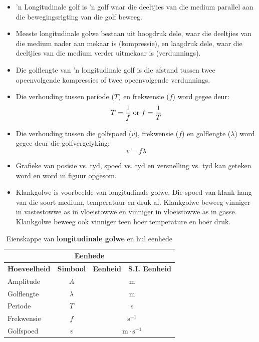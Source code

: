 \nopagebreak
      \label{m38783*id293550}\begin{itemize}[noitemsep] 
            \label{m38783*uid20}\item 'n Longitudinale golf is 'n golf waar die deeltjies van die medium parallel aan die bewegingsrigting van die golf beweeg.
\label{m38783*uid21}\item Meeste longitudinale golwe bestaan uit hoogdruk dele, waar die deeltjies van die medium nader aan mekaar is (kompressie), en laagdruk dele, waar die deeltjies van die medium verder uitmekaar is (verdunnings).
\label{m38783*uid22}\item Die golflengte van 'n longitudinale golf is die afstand tussen twee opeenvolgende kompressies of twee opeenvolgende verdunnings.
\label{m38783*uid23}\item Die verhouding tussen periode ($T$) en frekwensie ($f$) word gegee deur:
\label{m38783*id293619}\nopagebreak\noindent{}
    \begin{equation}\nonumber
    T=\frac{1}{f}\phantom{\rule{3pt}{0ex}}\text{or}\phantom{\rule{3pt}{0ex}}f=\frac{1}{T}
      \end{equation}
    \label{m38783*uid24}\item Die verhouding tussen die golfspoed ($v$), frekwensie ($f$) en golflengte ($\lambda$) word gegee deur die golfvergelyking:
\label{m38783*id293694}\nopagebreak\noindent{}
    \begin{equation}\nonumber
    v=f\lambda
      \end{equation}
    \label{m38783*uid25}\item Grafieke van posisie vs. tyd, spoed vs. tyd en versnelling vs. tyd kan geteken word en word in figuur \label{m38783*uid26} opgesom.
\item Klankgolwe is voorbeelde van longitudinale golwe. Die spoed van klank hang van die soort medium, temperatuur en druk af. Klankgolwe beweeg vinniger in vastestowwe as in vloeistowwe en vinniger in vloeistowwe as in gasse. Klankgolwe beweeg ook vinniger teen ho\"er temperature en ho\"er druk.
\end{itemize}
\begin{table}[H]
\begin{center}
\begin{tabular}{|l|c|c|c|}\hline \hline 
\multicolumn{4}{|c|}{\textbf{Eenhede}}\\ \hline \hline
\textbf{Hoeveelheid} & \textbf{Simbool} & \textbf{Eenheid} & \textbf{S.I. Eenheid}\\ \hline
Amplitude & $A$ & \multicolumn{2}{c|}{m} \\ \hline
Golflengte & $\lambda$ & \multicolumn{2}{c|}{m}  \\ \hline
Periode & $T$ & \multicolumn{2}{c|}{s}  \\ \hline
Frekwensie & $f$ & \multicolumn{2}{c|}{$\text{s}^{-1}$}  \\ \hline
Golfspoed & $v$ & \multicolumn{2}{c|}{$\text{m} \cdot \text{s}^{-1}$} \\ \hline
\end{tabular}
\end{center}
\caption{Eienskappe van \textbf{longitudinale golwe} en hul eenhede}
\label{table:electricity::units}
\end{table}
